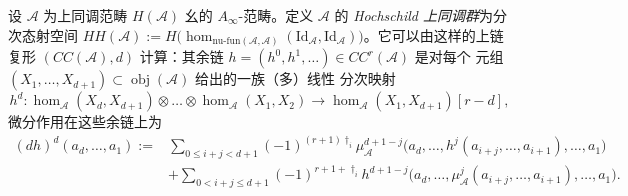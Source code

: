 \begin{Def}\label{def:2.14}
设 $\mathcal A$ 为上同调范畴 $H(\mathcal A)$ 幺的 $A_\infty$-范畴。定义 $\mathcal A$ 的
\emph{Hochschild 上同调群}为分次态射空间
$HH(\mathcal A):=H\bigl(\hom_{\mathrm{nu\text{-}fun}(\mathcal A,\mathcal A)}
(\mathrm{Id}_{\mathcal A},\mathrm{Id}_{\mathcal A})\bigr)$。它可以由这样的上链复形
$(CC(\mathcal A),d)$ 计算：其余链 $h=(h^0,h^1,\dots)\in CC^r(\mathcal A)$ 是对每个
元组 $(X_1,\dots,X_{d+1})\subset\operatorname{obj}(\mathcal A)$ 给出的一族（多）线性
分次映射
\[
  h^d:\hom_{\mathcal A}(X_d,X_{d+1})\otimes\dots\otimes\hom_{\mathcal A}(X_1,X_2)
  \longrightarrow\hom_{\mathcal A}(X_1,X_{d+1})[r-d],
\]
微分作用在这些余链上为
\[
  \begin{aligned}
    (dh)^d(a_d,\dots,a_1):={}&\sum_{0\le i+j<d+1}(-1)^{(r+1)\dagger_i}
    \mu^{d+1-j}_{\mathcal A}\bigl(a_d,\dots,h^j(a_{i+j},\dots,a_{i+1}),\dots,a_1\bigr)\\
    &+\sum_{0<i+j\le d+1}(-1)^{r+1+\dagger_i}
    h^{d+1-j}\bigl(a_d,\dots,\mu^j_{\mathcal A}(a_{i+j},\dots,a_{i+1}),\dots,a_1\bigr).
  \end{aligned}
\]
\end{Def}

